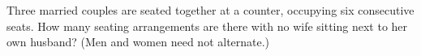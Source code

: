Three married couples are seated together at a counter, occupying six consecutive seats. How many seating arrangements are there with no wife sitting next to her own husband? (Men and women need not alternate.)
